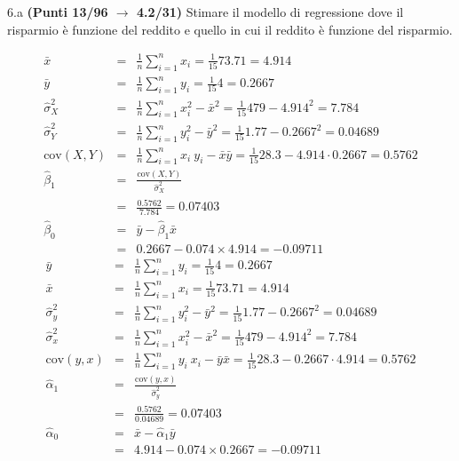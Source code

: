 \documentclass[
  11pt,
]{book}
\theoremstyle{mytheoremstyle}
\theoremstyle{mydefstyle}
\newenvironment{sol}
  {
  \begin{tcolorbox}[enhanced,breakable,arc=0.1mm,boxrule=1pt,colback=white,colframe=iblue,
  title=\bf \fontfamily{lmss}\selectfont \hspace{.5 cm} Soluzione,drop fuzzy shadow]

}{
\end{tcolorbox}
  }
\begin{document}
6.a \textbf{(Punti 13/96 \(\rightarrow\) 4.2/31)} Stimare il modello di regressione dove il risparmio è funzione del reddito e quello in cui il reddito è funzione del risparmio.

\begin{sol}
\begin{eqnarray*}
           \bar x &=&\frac 1 n\sum_{i=1}^n x_i = \frac {1}{ 15 }  73.71 =  4.914 \\
           \bar y &=&\frac 1 n\sum_{i=1}^n y_i = \frac {1}{ 15 }  4 =  0.2667 \\
           \hat\sigma_X^2&=&\frac 1 n\sum_{i=1}^n x_i^2-\bar x^2=\frac {1}{ 15 }  479  - 4.914 ^2= 7.784 \\
           \hat\sigma_Y^2&=&\frac 1 n\sum_{i=1}^n y_i^2-\bar y^2=\frac {1}{ 15 }  1.77  - 0.2667 ^2= 0.04689 \\
           \text{cov}(X,Y)&=&\frac 1 n\sum_{i=1}^n x_i~y_i-\bar x\bar y=\frac {1}{ 15 }  28.3 - 4.914 \cdot 0.2667 = 0.5762 \\
           \hat\beta_1 &=& \frac{\text{cov}(X,Y)}{\hat\sigma_X^2} \\
                    &=& \frac{ 0.5762 }{ 7.784 }  =  0.07403 \\
           \hat\beta_0 &=& \bar y - \hat\beta_1 \bar x\\
                    &=&  0.2667 - 0.074 \times  4.914 = -0.09711 
         \end{eqnarray*}\begin{eqnarray*}
\bar y &=&\frac 1 n\sum_{i=1}^n y_i = \frac {1}{ 15 }  4 =  0.2667 \\
\bar x &=&\frac 1 n\sum_{i=1}^n x_i = \frac {1}{ 15 }  73.71 =  4.914 \\
\hat\sigma_y^2&=&\frac 1 n\sum_{i=1}^n y_i^2-\bar y^2=\frac {1}{ 15 }  1.77  - 0.2667 ^2= 0.04689 \\
\hat\sigma_x^2&=&\frac 1 n\sum_{i=1}^n x_i^2-\bar x^2=\frac {1}{ 15 }  479  - 4.914 ^2= 7.784 \\
\text{cov}(y,x)&=&\frac 1 n\sum_{i=1}^n y_i~x_i-\bar y\bar x=\frac {1}{ 15 }  28.3 - 0.2667 \cdot 4.914 = 0.5762 \\
\hat\alpha_1 &=& \frac{\text{cov}(y,x)}{\hat\sigma_y^2} \\
         &=& \frac{ 0.5762 }{ 0.04689 }  =  0.07403 \\
\hat\alpha_0 &=& \bar x - \hat\alpha_1 \bar y\\
         &=&  4.914 - 0.074 \times  0.2667 = -0.09711 
\end{eqnarray*}

\end{sol}
\end{document}

